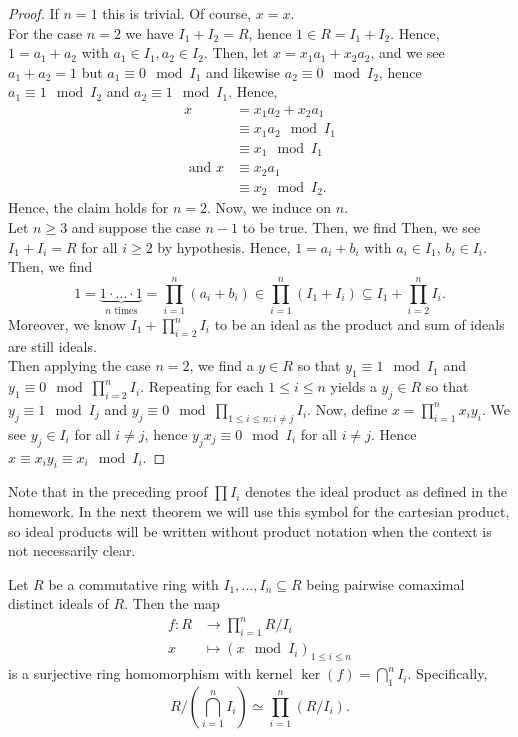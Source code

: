 \begin{proof}
If \(n = 1\) this is trivial. Of course, \(x = x\).\\
For the case \(n = 2\) we have \(I_1 + I_2 = R\), hence \(1 \in R = I_1 + I_2\). Hence, \(1 = a_1 + a_2\) with \(a_1 \in I_1, a_2 \in I_2\). Then, let \(x = x_1a_1 + x_2a_2\), and we see \(a_1 + a_2 = 1\) but \(a_1 \equiv 0 \mod I_1\) and likewise \(a_2 \equiv 0 \mod I_2\), hence \(a_1 \equiv 1 \mod I_2\) and \(a_2 \equiv 1 \mod I_1\). Hence, \begin{align*}
x &= x_1a_2 + x_2a_1 \\
  &\equiv x_1 a_2 \mod I_1\\
  &\equiv x_1 \mod I_1\\
\text{ and } x &\equiv x_2a_1  \\
	       &\equiv x_2 \mod I_2
.\end{align*}
Hence, the claim holds for \(n=2\). Now, we induce on \(n\).\\
Let \(n \ge 3\) and suppose the case \(n-1\) to be true. Then, we find Then, we see \(I_1 + I_{i} = R\) for all \(i \ge 2\) by hypothesis. Hence, \(1 = a_{i} + b_{i}\) with \(a_{i} \in I_1\), \(b_{i} \in I_{i}\). Then, we find \[1 = \underbrace{1\cdot \ldots \cdot 1}_{n \text{ times}} = \prod_{i= 1}^{n} (a_{i}+ b_{i}) \in \prod_{i= 1}^{n} \left( I_1 + I_{i} \right) \subseteq I_1 + \prod_{i=2}^{n} I_{i}     .\] Moreover, we know \(I_1 + \prod_{i=2}^{n} I_{i} \) to be an ideal as the product and sum of ideals are still ideals.\\
Then applying the case \(n=2\), we find a \(y \in R\) so that \(y_1 \equiv 1 \mod I_1\) and \(y_1 \equiv 0 \mod \prod_{i=2}^{n} I_{i} \). Repeating for each \(1 \le i \le n\) yields a \(y_{j} \in R\) so that \(y_{j} \equiv 1 \mod I_{j}\) and \(y_{j} \equiv 0 \mod \prod_{1 \le i \le n; i \neq j}^{} I_{i} \). Now, define \(x = \prod_{i= 1}^{n} x_{i} y_{i} \). We see \(y_{j} \in I_{i}\) for all \(i \neq j\), hence \(y_{j} x_{j} \equiv 0 \mod I_{i}\) for all \(i \neq j\). Hence \(x \equiv x_{i} y_{i} \equiv x_{i} \mod I_{i}\).
\end{proof}
Note that in the preceding proof \(\prod I_{i} \) denotes the ideal product as defined in the homework. In the next theorem we will use this symbol for the cartesian product, so ideal products will be written without product notation when the context is not necessarily clear.
\begin{corollary}
Let \(R\) be a commutative ring with \(I_1, \ldots, I_{n} \subseteq R\) being pairwise comaximal distinct ideals of \(R\). Then the map \begin{align*}
	f: R &\longrightarrow \prod_{i= 1}^{n} R / I_{i}  \\
	x&\longmapsto \left( x \mod I_{i} \right)_{1 \le i \le n}
	\end{align*} is a surjective ring homomorphism with kernel \(\ker \left( f \right)  = \bigcap_{1} ^{n} I_{i}\). Specifically, \[
R / \left( \bigcap_{i=1} ^{n} I_{i} \right) \simeq \prod_{i= 1}^{n} \left( R / I_{i} \right)
.\]
\end{corollary}
